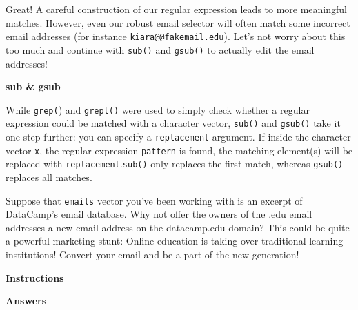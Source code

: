 \documentclass[]{article}
\newcommand{\hlstr}[1]{\textcolor[rgb]{0.251,0.627,0.251}{#1}}%
\newcommand{\hlstd}[1]{\textcolor[rgb]{0.251,0.251,0.251}{#1}}%
\newcommand{\hlkwc}[1]{\textcolor[rgb]{0.251,0.251,0.251}{#1}}%
\newenvironment{Shaded}{\begin{myshaded}}{\end{myshaded}}
\newcommand{\DataTypeTok}[1]{\hlkwc{#1}}
\newcommand{\CharTok}[1]{\hlstr{#1}}
\newcommand{\StringTok}[1]{\hlstr{#1}}
\newcommand{\NormalTok}[1]{\hlstd{#1}}
\begin{document}
Great! A careful construction of our regular expression leads to more
meaningful matches. However, even our robust email selector will often
match some incorrect email addresses (for instance
\href{mailto:kiara@@fakemail.edu}{\nolinkurl{kiara@@fakemail.edu}}).
Let's not worry about this too much and continue with \texttt{sub()} and
\texttt{gsub()} to actually edit the email addresses!

\textbf{sub \& gsub}

While \texttt{grep(}) and \texttt{grepl()} were used to simply check
whether a regular expression could be matched with a character vector,
\texttt{sub()} and \texttt{gsub()} take it one step further: you can
specify a \texttt{replacement} argument. If inside the character vector
\texttt{x}, the regular expression \texttt{pattern} is found, the
matching element(s) will be replaced with
\texttt{replacement}.\texttt{sub()} only replaces the first match,
whereas \texttt{gsub()} replaces all matches.

Suppose that \texttt{emails} vector you've been working with is an
excerpt of DataCamp's email database. Why not offer the owners of the
.edu email addresses a new email address on the datacamp.edu domain?
This could be quite a powerful marketing stunt: Online education is
taking over traditional learning institutions! Convert your email and be
a part of the new generation!

\textbf{Instructions}

\begin{Shaded}
\end{Shaded}

\textbf{Answers}
\end{document}
